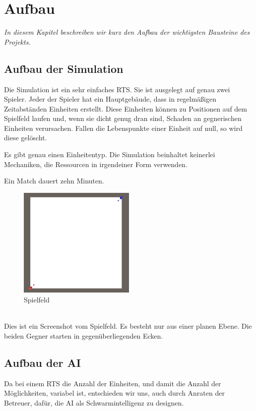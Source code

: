 \documentclass[
	12pt,
	a4paper,
	BCOR10mm,
	DIV14,
	headsepline,
	usegeometry,
]{scrreprt}
\begin{document}
\chapter{Aufbau}
\label{Aufbau}

\textit{%
In diesem Kapitel beschreiben wir kurz den Aufbau der wichtigsten Bausteine des Projekts.
}

\bigskip

\section{Aufbau der Simulation}
Die Simulation ist ein sehr einfaches RTS. 
Sie ist ausgelegt auf genau zwei Spieler. 
Jeder der Spieler hat ein Hauptgebäude, dass in regelmäßigen Zeitabständen Einheiten erstellt. 
Diese Einheiten können zu Positionen auf dem Spielfeld laufen und, wenn sie dicht genug dran sind, Schaden an gegnerischen Einheiten verursachen. 
Fallen die Lebenspunkte einer Einheit auf null, so wird diese gelöscht.

Es gibt genau einen Einheitentyp. Die Simulation beinhaltet keinerlei Mechaniken, die Ressourcen in irgendeiner Form verwenden.

Ein Match dauert zehn Minuten.
\begin{figure}[h]
	\centering
	\includegraphics[width = 0.5\textwidth]{Spielfeld.png}
	\caption{Spielfeld}
	\label{Spielfeld}
\end{figure}\\
Dies ist ein Screenshot vom Spielfeld. Es besteht nur aus einer planen Ebene. Die beiden Gegner starten in gegenüberliegenden Ecken.

\section{Aufbau der AI}
Da bei einem RTS die Anzahl der Einheiten, und damit die Anzahl der Möglichkeiten, variabel ist, entschieden wir uns, auch durch Anraten der Betreuer, dafür, die AI als Schwarmintelligenz zu designen.
\end{document}
